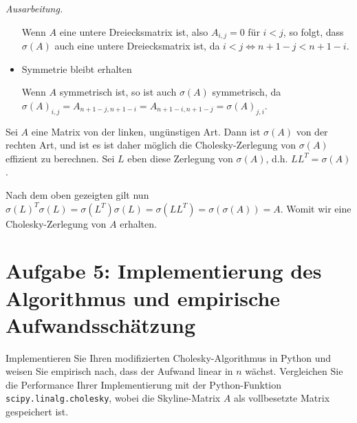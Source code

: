 \documentclass[]{article}
\newenvironment{ausarbeitung}{\vspace{3mm}\noindent\textit{Ausarbeitung.}}{}
\begin{document}
\begin{ausarbeitung}
\begin{itemize}
		Wenn $A$ eine untere Dreiecksmatrix ist, also $A_{i,j} = 0$ für $i < j$, so folgt, dass $\sigma(A)$ auch eine untere Dreiecksmatrix ist, da $i < j \iff n+1-j < n+1-i$.
		
		\item Symmetrie bleibt erhalten
		
		Wenn $A$ symmetrisch ist, so ist auch $\sigma(A)$ symmetrisch, da $\sigma(A)_{i,j} = A_{n+1-j,n+1-i} = A_{n+1-i,n+1-j} = \sigma(A)_{j,i}$.	
	\end{itemize}

	Sei $A$ eine Matrix von der linken, ungünstigen Art. Dann ist $\sigma(A)$ von der rechten Art, und ist es ist daher möglich die Cholesky-Zerlegung von $\sigma(A)$ effizient zu berechnen. Sei $L$ eben diese Zerlegung von $\sigma(A)$, d.h. $LL^T=\sigma(A)$.
	
	Nach dem oben gezeigten gilt nun $\sigma(L)^T\sigma(L) = \sigma(L^T)\sigma(L) = \sigma(LL^T) = \sigma(\sigma(A)) = A$. Womit wir eine Cholesky-Zerlegung von $A$ erhalten.
\end{ausarbeitung}
\newpage



\section*{Aufgabe 5: Implementierung des Algorithmus und empirische Aufwandsschätzung}
Implementieren Sie Ihren modifizierten Cholesky-Algorithmus in Python und weisen Sie empirisch nach, dass der Aufwand linear in $n$ wächst. Vergleichen Sie die Performance Ihrer Implementierung mit der Python-Funktion \texttt{scipy.linalg.cholesky}, wobei die Skyline-Matrix $A$ als vollbesetzte Matrix gespeichert ist.
\end{document}
